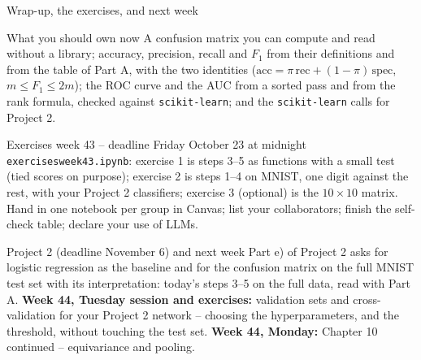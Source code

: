 \documentclass[10pt,aspectratio=169]{beamer}
\begin{document}
\begin{frame}{Wrap-up, the exercises, and next week}
\small
\begin{block}{What you should own now}
\footnotesize
A confusion matrix you can compute and read without a library; accuracy,
precision, recall and $F_1$ from their definitions and from the table of
Part A, with the two identities ($\mathrm{acc}=\pi\,\mathrm{rec}+(1-\pi)\,
\mathrm{spec}$, $m\le F_1\le2m$); the ROC curve and the AUC from a sorted
pass and from the rank formula, checked against \texttt{scikit-learn}; and
the \texttt{scikit-learn} calls for Project 2.
\end{block}
\begin{block}{Exercises week 43 -- deadline Friday October 23 at midnight}
\footnotesize
\texttt{exercisesweek43.ipynb}: exercise 1 is steps 3--5 as functions
with a small test (tied scores on purpose); exercise 2 is steps 1--4 on
MNIST, one digit against the rest, with your Project 2 classifiers;
exercise 3 (optional) is the $10\times10$ matrix.  Hand in one notebook per
group in Canvas; list your collaborators; finish the self-check table;
declare your use of LLMs.
\end{block}
\begin{block}{Project 2 (deadline November 6) and next week}
\footnotesize
Part e) of Project 2 asks for logistic regression as the baseline and for
the confusion matrix on the full MNIST test set with its interpretation:
today's steps 3--5 on the full data, read with Part A.  \textbf{Week 44,
Tuesday session and exercises:} validation sets and cross-validation for
your Project 2 network -- choosing the hyperparameters, and the threshold,
without touching the test set.  \textbf{Week 44, Monday:} Chapter 10
continued -- equivariance and pooling.
\end{block}
\end{frame}
\end{document}
